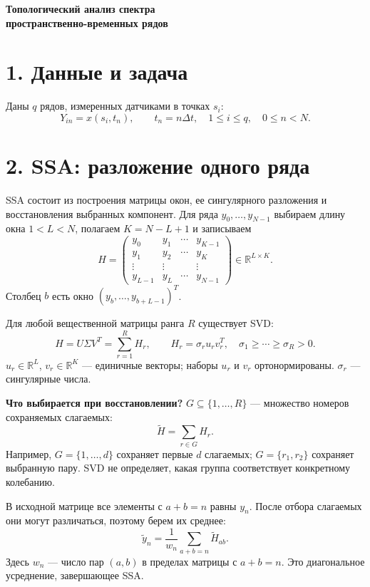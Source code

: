 \documentclass[11pt,a4paper]{article}
\begin{document}
\begin{center}
{\large\bfseries Топологический анализ спектра\\
пространственно-временных рядов}
\end{center}

\section*{1. Данные и задача}
Даны $q$ рядов, измеренных датчиками в точках $s_i$:
\[
 Y_{in}=x(s_i,t_n),\qquad t_n=n\Delta t,\quad
 1\leq i\leq q,\quad 0\leq n<N.
\]

\section*{2. SSA: разложение одного ряда}
SSA состоит из построения матрицы окон,
ее сингулярного разложения и восстановления выбранных компонент.
Для ряда $y_0,\ldots,y_{N-1}$ выбираем длину окна $1<L<N$,
полагаем $K=N-L+1$ и записываем
\[
 H=\begin{pmatrix}
 y_0&y_1&\cdots&y_{K-1}\\
 y_1&y_2&\cdots&y_K\\
 \vdots&\vdots&&\vdots\\
 y_{L-1}&y_L&\cdots&y_{N-1}
 \end{pmatrix}\in\mathbb R^{L\times K}.
\]
Столбец $b$ есть окно $(y_b,\ldots,y_{b+L-1})^T$.

Для любой вещественной матрицы ранга $R$ существует SVD:
\[
 H=U\Sigma V^T=\sum_{r=1}^{R}H_r,\qquad
 H_r=\sigma_ru_rv_r^T,\quad \sigma_1\geq\cdots\geq\sigma_R>0.
\]
$u_r\in\mathbb R^L$, $v_r\in\mathbb R^K$ --- единичные векторы;
наборы $u_r$ и $v_r$ ортонормированы. $\sigma_r$ --- сингулярные числа.

\textbf{Что выбирается при восстановлении?}
$G\subseteq\{1,\ldots,R\}$ --- множество номеров сохраняемых слагаемых:
\[
 \widetilde H=\sum_{r\in G}H_r.
\]
Например, $G=\{1,\ldots,d\}$ сохраняет первые $d$ слагаемых;
$G=\{r_1,r_2\}$ сохраняет выбранную пару. SVD не определяет,
какая группа соответствует конкретному колебанию.

В исходной матрице все элементы с $a+b=n$ равны $y_n$.
После отбора слагаемых они могут различаться, поэтому берем их среднее:
\[
 \widetilde y_n=\frac1{w_n}\sum_{a+b=n}\widetilde H_{ab}.
\]
Здесь $w_n$ --- число пар $(a,b)$ в пределах матрицы с $a+b=n$.
Это диагональное усреднение, завершающее SSA.
\end{document}

